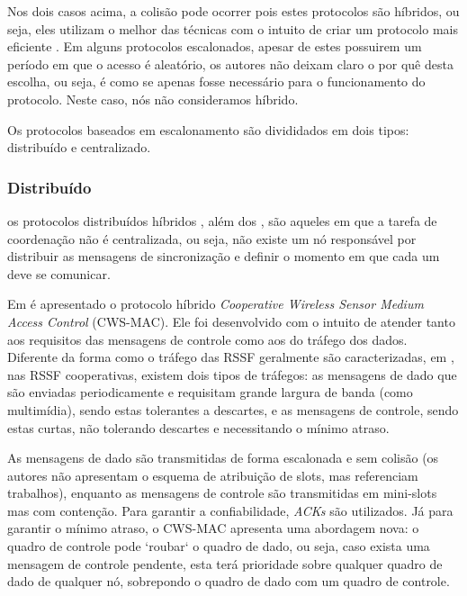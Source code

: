 \documentclass[12pt]{article}
\begin{document}
    Nos dois casos acima, a colisão pode ocorrer pois estes protocolos são híbridos, ou seja, eles utilizam o melhor das técnicas com o intuito de criar um protocolo mais eficiente \cite{20092612148942}. Em alguns protocolos escalonados, apesar de estes possuirem um período em que o acesso é aleatório, os autores não deixam claro o por quê desta escolha, ou seja, é como se apenas fosse necessário para o funcionamento do protocolo. Neste caso, nós não consideramos híbrido.

    Os protocolos baseados em escalonamento são divididados em dois tipos: distribuído e centralizado.

  \subsubsection{Distribuído}
    os protocolos distribuídos híbridos \cite{20102813064978, 20102613043092, 20094012349418, 20093112234782, 20083811560517, 20092612148942, 20093812310584}, além dos \cite{20103113115754, 20100512680000}, são aqueles em que a tarefa de coordenação não é centralizada, ou seja, não existe um nó responsável por distribuir as mensagens de sincronização e definir o momento em que cada um deve se comunicar.

    Em \cite{20083811560517} é apresentado o protocolo híbrido \textit{Cooperative Wireless Sensor Medium Access Control} (CWS-MAC). Ele foi desenvolvido com o intuito de atender tanto aos requisitos das mensagens de controle como aos do tráfego dos dados. Diferente da forma como o tráfego das RSSF geralmente são caracterizadas, em \cite{20083811560517}, nas RSSF cooperativas, existem dois tipos de tráfegos: as mensagens de dado que são enviadas periodicamente e requisitam grande largura de banda (como multimídia), sendo estas tolerantes a descartes, e as mensagens de controle, sendo estas curtas, não tolerando descartes e necessitando o mínimo atraso. 
    
    As mensagens de dado são transmitidas de forma escalonada e sem colisão (os autores não apresentam o esquema de atribuição de slots, mas referenciam trabalhos), enquanto as mensagens de controle são transmitidas em mini-slots mas com contenção. Para garantir a confiabilidade, \textit{ACKs} são utilizados. Já para garantir o mínimo atraso, o CWS-MAC apresenta uma abordagem nova: o quadro de controle pode `roubar` o quadro de dado, ou seja, caso exista uma mensagem de controle pendente, esta terá prioridade sobre qualquer quadro de dado de qualquer nó, sobrepondo o quadro de dado com um quadro de controle.
\end{document}

